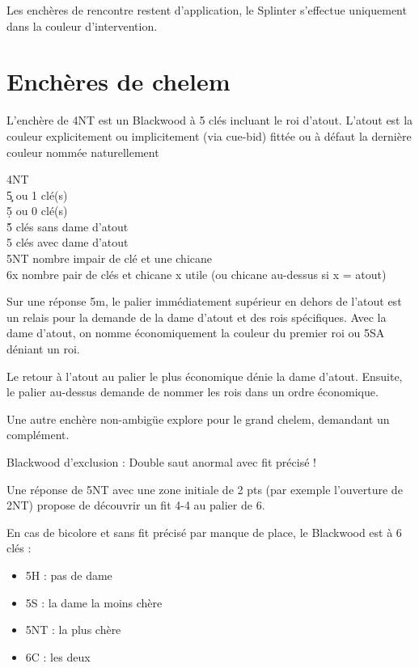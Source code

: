 \documentclass[a4paper]{article}
\begin{document}
Les enchères de rencontre restent d'application, le Splinter s'effectue uniquement dans la couleur d'intervention.

\section{Enchères de chelem}

L'enchère de 4NT est un Blackwood à 5 clés incluant le roi d'atout. L'atout est la couleur explicitement ou implicitement (via cue-bid) fittée ou à défaut la dernière couleur nommée naturellement

\begin{bidtable}
4NT\+\\
5\c {} ou 1 clé(s)\\
5\d {} ou 0 clé(s)\\
5\h {} clés sans dame d'atout\\
5\s {} clés avec dame d'atout\\
5NT \> nombre impair de clé et une chicane\\
6x \> nombre pair de clés et chicane x utile (ou chicane au-dessus si x = atout)\-
\end{bidtable}

Sur une réponse 5m, le palier immédiatement supérieur en dehors de l'atout est un relais pour la demande de la dame d'atout et des rois spécifiques.
Avec la dame d'atout, on nomme économiquement la couleur du premier roi ou 5SA déniant un roi.

Le retour à l'atout au palier le plus économique dénie la dame d'atout. Ensuite, le palier au-dessus demande de nommer les rois dans un ordre économique.

Une autre enchère non-ambigüe explore pour le grand chelem, demandant un complément.

Blackwood d'exclusion : Double saut anormal avec fit précisé !

Une réponse de 5NT avec une zone initiale de 2 pts (par exemple l'ouverture de 2NT) propose de découvrir un fit 4-4 au palier de 6.

En cas de bicolore et sans fit précisé par manque de place, le Blackwood est à 6 clés :

\begin{itemize}
\item 5H : pas de dame

\item 5S : la dame la moins chère

\item 5NT : la plus chère

\item 6C : les deux

\end{itemize}
\end{document}
